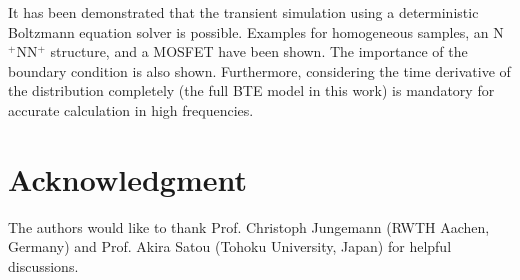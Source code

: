 \documentclass[journal]{IEEEtran}
\newcommand{\revision}[1]{{#1}}
\begin{document}
   It has been demonstrated that the transient simulation using a deterministic Boltzmann equation solver is possible.
\revision{Examples for homogeneous samples, an N$^+$NN$^+$ structure, and a MOSFET have been shown.}
   The importance of the boundary condition is also shown.
   Furthermore, considering the time derivative of the distribution completely (the full BTE model in this work) is mandatory for accurate calculation in high frequencies. 
   
\section*{Acknowledgment}

   The authors would like to thank Prof. Christoph Jungemann (RWTH Aachen, Germany) and Prof. Akira Satou (Tohoku University, Japan) for helpful discussions.

\ifCLASSOPTIONcaptionsoff
  \newpage
\fi





%
%
%
% 



% 
\end{document}
